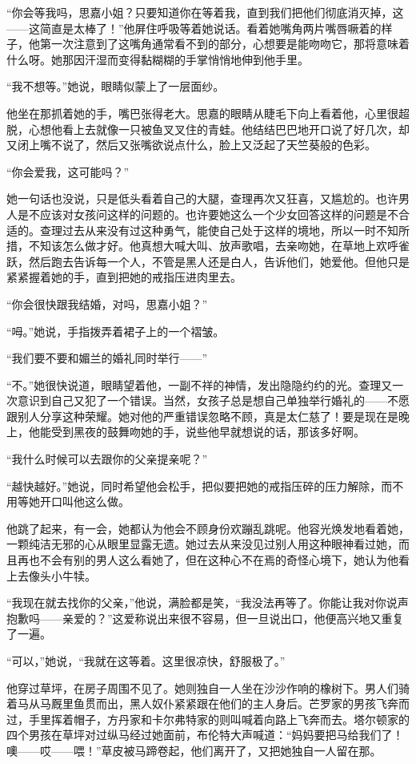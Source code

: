 \par “你会等我吗，思嘉小姐？只要知道你在等着我，直到我们把他们彻底消灭掉，这——这简直是太棒了！”他屏住呼吸等着她说话。看着她嘴角两片嘴唇噘着的样子，他第一次注意到了这嘴角通常看不到的部分，心想要是能吻吻它，那将意味着什么呀。她那因汗湿而变得黏糊糊的手掌悄悄地伸到他手里。
\par “我不想等。”她说，眼睛似蒙上了一层面纱。
\par 他坐在那抓着她的手，嘴巴张得老大。思嘉的眼睛从睫毛下向上看着他，心里很超脱，心想他看上去就像一只被鱼叉叉住的青蛙。他结结巴巴地开口说了好几次，却又闭上嘴不说了，然后又张嘴欲说点什么，脸上又泛起了天竺葵般的色彩。
\par “你会爱我，这可能吗？”
\par 她一句话也没说，只是低头看着自己的大腿，查理再次又狂喜，又尴尬的。也许男人是不应该对女孩问这样的问题的。也许要她这么一个少女回答这样的问题是不合适的。查理过去从来没有过这种勇气，能使自己处于这样的境地，所以一时不知所措，不知该怎么做才好。他真想大喊大叫、放声歌唱，去亲吻她，在草地上欢呼雀跃，然后跑去告诉每一个人，不管是黑人还是白人，告诉他们，她爱他。但他只是紧紧握着她的手，直到把她的戒指压进肉里去。
\par “你会很快跟我结婚，对吗，思嘉小姐？”
\par “呣。”她说，手指拨弄着裙子上的一个褶皱。
\par “我们要不要和媚兰的婚礼同时举行——”
\par “不。”她很快说道，眼睛望着他，一副不祥的神情，发出隐隐约约的光。查理又一次意识到自己又犯了一个错误。当然，女孩子总是想自己单独举行婚礼的——不愿跟别人分享这种荣耀。她对他的严重错误忽略不顾，真是太仁慈了！要是现在是晚上，他能受到黑夜的鼓舞吻她的手，说些他早就想说的话，那该多好啊。
\par “我什么时候可以去跟你的父亲提亲呢？”
\par “越快越好。”她说，同时希望他会松手，把似要把她的戒指压碎的压力解除，而不用等她开口叫他这么做。
\par 他跳了起来，有一会，她都认为他会不顾身份欢蹦乱跳呢。他容光焕发地看着她，一颗纯洁无邪的心从眼里显露无遗。她过去从来没见过别人用这种眼神看过她，而且再也不会有别的男人这么看她了，但在这种心不在焉的奇怪心境下，她认为他看上去像头小牛犊。
\par “我现在就去找你的父亲，”他说，满脸都是笑，“我没法再等了。你能让我对你说声抱歉吗——亲爱的？”这爱称说出来很不容易，但一旦说出口，他便高兴地又重复了一遍。
\par “可以，”她说，“我就在这等着。这里很凉快，舒服极了。”
\par 他穿过草坪，在房子周围不见了。她则独自一人坐在沙沙作响的橡树下。男人们骑着马从马厩里鱼贯而出，黑人奴仆紧紧跟在他们的主人身后。芒罗家的男孩飞奔而过，手里挥着帽子，方丹家和卡尔弗特家的则叫喊着向路上飞奔而去。塔尔顿家的四个男孩在草坪对过纵马经过她面前，布伦特大声喊道：“妈妈要把马给我们了！噢——哎——喂！”草皮被马蹄卷起，他们离开了，又把她独自一人留在那。
